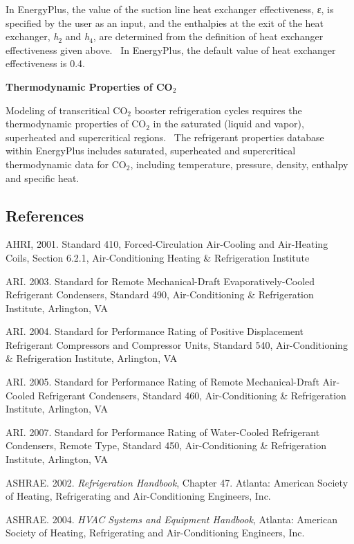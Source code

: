 In EnergyPlus, the value of the suction line heat exchanger effectiveness, ε, is specified by the user as an input, and the enthalpies at the exit of the heat exchanger, \emph{h}\(_{2}\) and \emph{h}\(_{4}\), are determined from the definition of heat exchanger effectiveness given above.~ In EnergyPlus, the default value of heat exchanger effectiveness is 0.4.

\textbf{Thermodynamic Properties of CO\(_{2}\)}

Modeling of transcritical CO\(_{2}\) booster refrigeration cycles requires the thermodynamic properties of CO\(_{2}\) in the saturated (liquid and vapor), superheated and supercritical regions.~ The refrigerant properties database within EnergyPlus includes saturated, superheated and supercritical thermodynamic data for CO\(_{2}\), including temperature, pressure, density, enthalpy and specific heat.

\subsection{References}\label{references-040}

AHRI, 2001. Standard 410, Forced-Circulation Air-Cooling and Air-Heating Coils, Section 6.2.1, Air-Conditioning Heating \& Refrigeration Institute

ARI. 2003. Standard for Remote Mechanical-Draft Evaporatively-Cooled Refrigerant Condensers, Standard 490, Air-Conditioning \& Refrigeration Institute, Arlington, VA

ARI. 2004. Standard for Performance Rating of Positive Displacement Refrigerant Compressors and Compressor Units, Standard 540, Air-Conditioning \& Refrigeration Institute, Arlington, VA

ARI. 2005. Standard for Performance Rating of Remote Mechanical-Draft Air-Cooled Refrigerant Condensers, Standard 460, Air-Conditioning \& Refrigeration Institute, Arlington, VA

ARI. 2007. Standard for Performance Rating of Water-Cooled Refrigerant Condensers, Remote Type, Standard 450, Air-Conditioning \& Refrigeration Institute, Arlington, VA

ASHRAE. 2002. \emph{Refrigeration Handbook}, Chapter 47. Atlanta: American Society of Heating, Refrigerating and Air-Conditioning Engineers, Inc.

ASHRAE. 2004. \emph{HVAC Systems and Equipment Handbook}, Atlanta: American Society of Heating, Refrigerating and Air-Conditioning Engineers, Inc.


